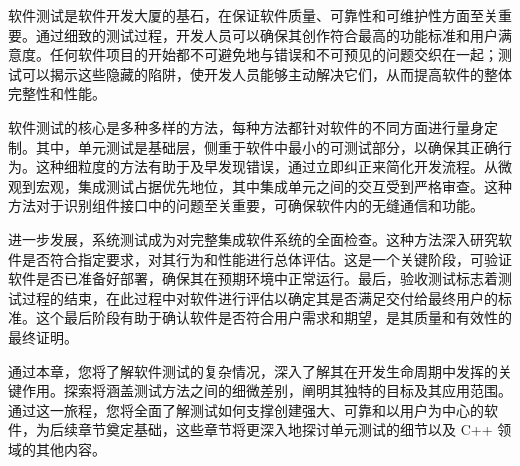 软件测试是软件开发大厦的基石，在保证软件质量、可靠性和可维护性方面至关重要。通过细致的测试过程，开发人员可以确保其创作符合最高的功能标准和用户满意度。任何软件项目的开始都不可避免地与错误和不可预见的问题交织在一起；测试可以揭示这些隐藏的陷阱，使开发人员能够主动解决它们，从而提高软件的整体完整性和性能。

软件测试的核心是多种多样的方法，每种方法都针对软件的不同方面进行量身定制。其中，单元测试是基础层，侧重于软件中最小的可测试部分，以确保其正确行为。这种细粒度的方法有助于及早发现错误，通过立即纠正来简化开发流程。从微观到宏观，集成测试占据优先地位，其中集成单元之间的交互受到严格审查。这种方法对于识别组件接口中的问题至关重要，可确保软件内的无缝通信和功能。

进一步发展，系统测试成为对完整集成软件系统的全面检查。这种方法深入研究软件是否符合指定要求，对其行为和性能进行总体评估。这是一个关键阶段，可验证软件是否已准备好部署，确保其在预期环境中正常运行。最后，验收测试标志着测试过程的结束，在此过程中对软件进行评估以确定其是否满足交付给最终用户的标准。这个最后阶段有助于确认软件是否符合用户需求和期望，是其质量和有效性的最终证明。

通过本章，您将了解软件测试的复杂情况，深入了解其在开发生命周期中发挥的关键作用。探索将涵盖测试方法之间的细微差别，阐明其独特的目标及其应用范围。通过这一旅程，您将全面了解测试如何支撑创建强大、可靠和以用户为中心的软件，为后续章节奠定基础，这些章节将更深入地探讨单元测试的细节以及 C++ 领域的其他内容。

